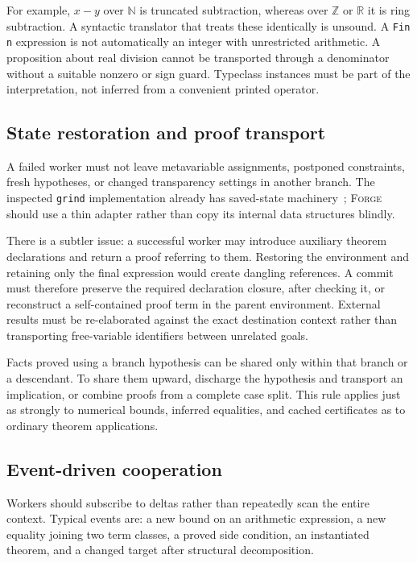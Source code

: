 \documentclass[11pt,a4paper]{article}
\theoremstyle{definition}
\newcommand{\forge}{\textsc{Forge}}
\newcommand{\grind}{\texttt{grind}}
\newcommand{\R}{\mathbb{R}}
\newcommand{\Z}{\mathbb{Z}}
\newcommand{\N}{\mathbb{N}}
\newcommand{\code}[1]{\texttt{#1}}
\begin{document}
For example, $x-y$ over $\N$ is truncated subtraction, whereas over $\Z$ or $\R$ it is ring subtraction. A syntactic translator that treats these identically is unsound. A \code{Fin n} expression is not automatically an integer with unrestricted arithmetic. A proposition about real division cannot be transported through a denominator without a suitable nonzero or sign guard. Typeclass instances must be part of the interpretation, not inferred from a convenient printed operator.

\subsection{State restoration and proof transport}

A failed worker must not leave metavariable assignments, postponed constraints, fresh hypotheses, or changed transparency settings in another branch. The inspected \grind{} implementation already has saved-state machinery~\cite{grindtypes}; \forge{} should use a thin adapter rather than copy its internal data structures blindly.

There is a subtler issue: a successful worker may introduce auxiliary theorem declarations and return a proof referring to them. Restoring the environment and retaining only the final expression would create dangling references. A commit must therefore preserve the required declaration closure, after checking it, or reconstruct a self-contained proof term in the parent environment. External results must be re-elaborated against the exact destination context rather than transporting free-variable identifiers between unrelated goals.

Facts proved using a branch hypothesis can be shared only within that branch or a descendant. To share them upward, discharge the hypothesis and transport an implication, or combine proofs from a complete case split. This rule applies just as strongly to numerical bounds, inferred equalities, and cached certificates as to ordinary theorem applications.

\subsection{Event-driven cooperation}

Workers should subscribe to deltas rather than repeatedly scan the entire context. Typical events are: a new bound on an arithmetic expression, a new equality joining two term classes, a proved side condition, an instantiated theorem, and a changed target after structural decomposition.
\end{document}
